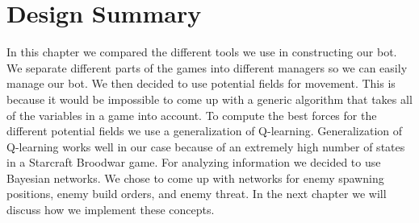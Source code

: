 \section{Design Summary}
In this chapter we compared the different tools we use in constructing our bot. We separate different parts of the games into different managers so we can easily manage our bot. We then decided to use potential fields for movement. This is because it would be impossible to come up with a generic algorithm that takes all of the variables in a game into account. To compute the best forces for the different potential fields we use a generalization of Q-learning. Generalization of Q-learning works well in our case because of an extremely high number of states in a Starcraft Broodwar game. For analyzing information we decided to use Bayesian networks. We chose to come up with networks for enemy spawning positions, enemy build orders, and enemy threat. In the next chapter we will discuss how we implement these concepts. 